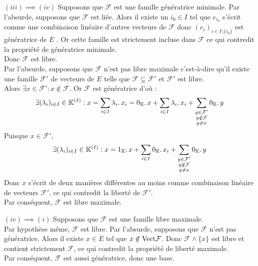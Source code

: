 \documentclass{article}
\begin{document}
\begin{question_kholle}
		$(iii) \implies (iv)$ Supposons que $\mathcal{F}$ est une famille génératrice minimale.
		Par l'absurde, supposons que $\mathcal{F}$ est liée. Alors il existe un $i_0 \in I$ tel que $e_{i_0}$ s'écrit comme une combinaison linéaire d'autres vecteurs de $\mathcal{F}$ donc $(e_i)_{i \in I \setminus \{i_0\}}$ est génératrice de $E$ . Or cette famille est strictement incluse dans $\mathcal{F}$ ce qui contredit la propriété de génératrice minimale. \\
		Donc $\mathcal{F}$ est libre. \\
		Par l'absurde, supposons que $\mathcal{F}$ n'est pas libre maximale c'est-à-dire qu'il existe une famille $\mathcal{F}'$ de vecteurs de $E$ telle que $\mathcal{F} \subsetneq \mathcal{F}'$ et $\mathcal{F}'$ est libre. \\
		Alors $\exists x \in \mathcal{F}' : x \notin \mathcal{F}$. Or $\mathcal{F}$ est génératrice d'où :
		\begin{equation*}
			\exists (\lambda_i)_{i \in I} \in \mathbb K^{(I)} :
			x = \sum_{i \in I} \lambda_i \ldotp x_i
			= 0_{\mathbb K} \ldotp x + \sum_{i \in I} \lambda_i \ldotp x_i + \sum_{\substack{y \in \mathcal{F}' \\ y \notin \mathcal{F} \\ y \neq x}} 0_{\mathbb K} \ldotp y
		\end{equation*}
		Puisque $x \in \mathcal{F}'$,
		\begin{equation*}
			\exists (\lambda_i)_{i \in I} \in \mathbb K^{(I)} :
			x = 1_{\mathbb K} \ldotp x + \sum_{i \in I} 0_{\mathbb K} \ldotp x_i + \sum_{\substack{y \in \mathcal{F}' \\ y \notin \mathcal{F} \\ y \neq x}} 0_{\mathbb K} \ldotp y
		\end{equation*}
		Donc $x$ s'écrit de deux manières différentes au moins comme combinaison linéaire de vecteurs $\mathcal{F}'$, ce qui contredit la liberté de $\mathcal{F}'$. \\
		Par conséquent, $\mathcal{F}$ est libre maximale.

		$(iv) \implies (i)$ Supposons que $\mathcal{F}$ est une famille libre maximale. \\
		Par hypothèse même, $\mathcal{F}$ est libre.
		Par l'absurde, supposons que $\mathcal{F}$ n'est pas génératrice. Alors il existe $x \in E$ tel que $x \notin \text{Vect} \mathcal{F}$. Donc $\mathcal{F} \wedge \{x\}$ est libre et contient strictement $\mathcal{F}$, ce qui contredit la propriété de liberté maximale. \\
		Par conséquent, $\mathcal{F}$ est aussi génératrice, donc une base.
	\end{question_kholle}
	
\end{document}
